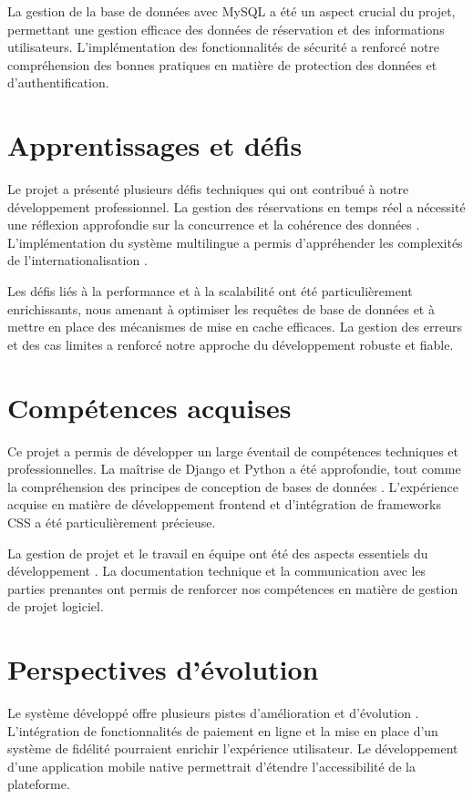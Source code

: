 \documentclass[12pt,a4paper]{report}
\begin{document}
La gestion de la base de données avec MySQL \cite{db-design} a été un aspect crucial du projet, permettant une gestion efficace des données de réservation et des informations utilisateurs. L'implémentation des fonctionnalités de sécurité \cite{django-security} a renforcé notre compréhension des bonnes pratiques en matière de protection des données et d'authentification.

\section{Apprentissages et défis}
Le projet a présenté plusieurs défis techniques qui ont contribué à notre développement professionnel. La gestion des réservations en temps réel a nécessité une réflexion approfondie sur la concurrence et la cohérence des données \cite{rest-best}. L'implémentation du système multilingue a permis d'appréhender les complexités de l'internationalisation \cite{django-docs}.

Les défis liés à la performance et à la scalabilité \cite{clean-code} ont été particulièrement enrichissants, nous amenant à optimiser les requêtes de base de données et à mettre en place des mécanismes de mise en cache efficaces. La gestion des erreurs et des cas limites a renforcé notre approche du développement robuste et fiable.

\section{Compétences acquises}
Ce projet a permis de développer un large éventail de compétences techniques et professionnelles. La maîtrise de Django et Python \cite{python-web} a été approfondie, tout comme la compréhension des principes de conception de bases de données \cite{db-design}. L'expérience acquise en matière de développement frontend \cite{material-design} et d'intégration de frameworks CSS \cite{bootstrap} a été particulièrement précieuse.

La gestion de projet et le travail en équipe ont été des aspects essentiels du développement \cite{clean-code}. La documentation technique \cite{django-docs} et la communication avec les parties prenantes ont permis de renforcer nos compétences en matière de gestion de projet logiciel.

\section{Perspectives d'évolution}
Le système développé offre plusieurs pistes d'amélioration et d'évolution \cite{django-pro}. L'intégration de fonctionnalités de paiement en ligne et la mise en place d'un système de fidélité pourraient enrichir l'expérience utilisateur. Le développement d'une application mobile native \cite{material-design} permettrait d'étendre l'accessibilité de la plateforme.
\end{document}
